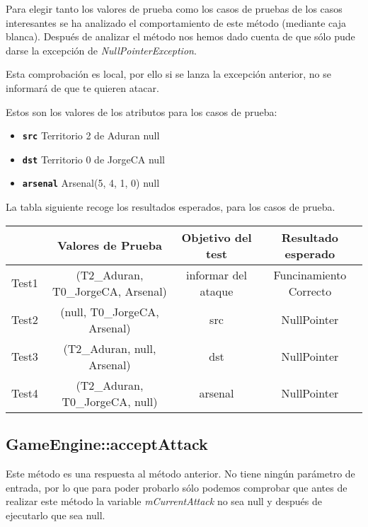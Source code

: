 Para elegir tanto los valores de prueba como los casos de pruebas de los casos interesantes se ha analizado el comportamiento de este método (mediante caja blanca). Después de analizar el método nos hemos dado cuenta de que sólo pude darse la excepción de \textit{NullPointerException}.

Esta comprobación es local, por ello si se lanza la excepción anterior, no se informará de que te quieren atacar.

Estos son los valores de los atributos para los casos de prueba:
\begin{itemize}
\item \textbf{\texttt{src}}
\subitem Territorio 2 de Aduran
\subitem null

\item \textbf{\texttt{dst}}
\subitem Territorio 0 de JorgeCA
\subitem null

\item \textbf{\texttt{arsenal}}
\subitem Arsenal(5, 4, 1, 0)
\subitem null
\end{itemize}

La tabla siguiente recoge los resultados esperados, para los casos de prueba.

{\footnotesize
\begin{longtable}[c]{lccc}
 & \textbf{Valores de Prueba} & \textbf{Objetivo del test} & \textbf{Resultado esperado} \\
\hline \hline
\endhead

Test1 & (T2\_Aduran, T0\_JorgeCA, Arsenal) & informar del ataque & Funcinamiento Correcto\\
Test2 & (null, T0\_JorgeCA, Arsenal) & src & NullPointer\\
Test3 & (T2\_Aduran, null, Arsenal) & dst & NullPointer\\
Test4 & (T2\_Aduran, T0\_JorgeCA, null) & arsenal & NullPointer\\

\hline
\end{longtable}
}

\subsection{GameEngine::acceptAttack}

Este método es una respuesta al método anterior. No tiene ningún parámetro de entrada, por lo que para poder probarlo sólo podemos comprobar que antes de realizar este método la variable \textit{mCurrentAttack} no sea null y después de ejecutarlo que sea null.

